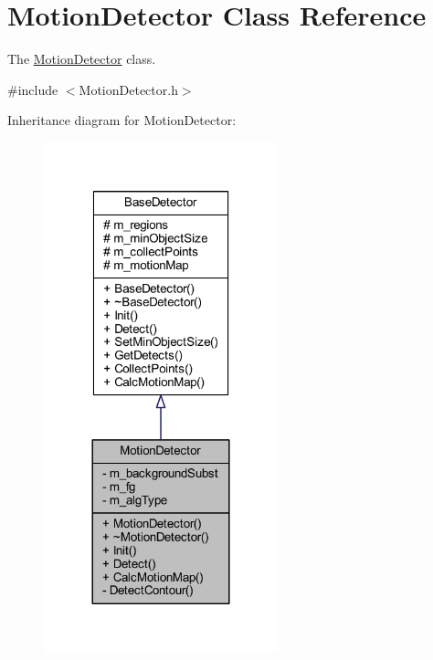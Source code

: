 \hypertarget{class_motion_detector}{}\section{Motion\+Detector Class Reference}
\label{class_motion_detector}


The \mbox{\hyperlink{class_motion_detector}{Motion\+Detector}} class.  




{\ttfamily \#include $<$Motion\+Detector.\+h$>$}



Inheritance diagram for Motion\+Detector\+:\nopagebreak
\begin{figure}[H]
\begin{center}
\leavevmode
\includegraphics[width=192pt]{class_motion_detector__inherit__graph}
\end{center}
\end{figure}


